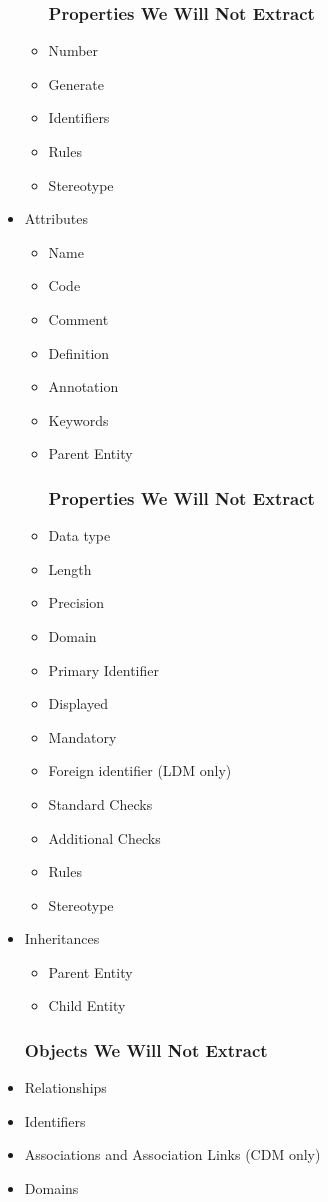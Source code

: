 \documentclass[12pt,a4paper]{report}
\begin{document}
\begin{itemize}
\begin{itemize}
		\subsubsection{Properties We Will Not Extract}
		\item Number
		\item Generate
		\item Identifiers
		\item Rules
		\item Stereotype
	\end{itemize}
	\item Attributes
	\begin{itemize}
		\item Name 
		\item Code 
		\item Comment
		\item Definition
		\item Annotation
		\item Keywords
		\item Parent Entity
		\subsubsection{Properties We Will Not Extract}
		\item Data type 
		\item Length 
		\item Precision
		\item Domain
		\item Primary Identifier
		\item Displayed
		\item Mandatory
		\item Foreign identifier (LDM only)
		\item Standard Checks
		\item Additional Checks
		\item Rules
		\item Stereotype
	\end{itemize}
	\item Inheritances
	\begin{itemize}
		\item Parent Entity
		\item Child Entity
	\end{itemize}
	\subsubsection{Objects We Will Not Extract}
	\item Relationships
	\item Identifiers
	\item Associations and Association Links (CDM only)
	\item Domains
\end{itemize}
\end{document}
